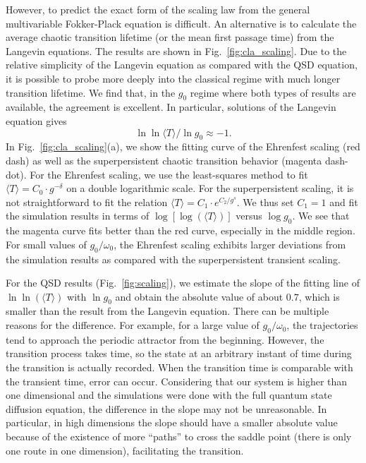 \documentclass[12pt]{wlscirep}
\begin{document}
However, to predict the exact form of the scaling law from the general 
multivariable Fokker-Plack equation is difficult. An alternative is to
calculate the average chaotic transition lifetime (or the mean first
passage time) from the Langevin equations. The results are shown in
Fig.~\ref{fig:cla_scaling}. Due to the relative simplicity of the Langevin
equation as compared with the QSD equation, it is possible to probe more
deeply into the classical regime with much longer transition lifetime. 
We find that, in the $g_0$ regime where both types of results are available,
the agreement is excellent. In particular, solutions of the Langevin
equation gives
\begin{displaymath}
\ln{\ln{\langle T\rangle}}/\ln{g_0} \approx -1.
\end{displaymath}
In Fig.~\ref{fig:cla_scaling}(a), we show the fitting curve of the
Ehrenfest scaling (red dash) as well as the superpersistent chaotic transition
behavior (magenta dash-dot). For the Ehrenfest scaling, we use the 
least-squares method to fit $\langle T\rangle=C_0\cdot g^{-\delta}$ on a 
double logarithmic scale. For the superpersistent scaling, it is not 
straightforward to fit the relation $\langle T\rangle=C_1\cdot e^{C_2/g^s}$. 
We thus set $C_1=1$ and fit the simulation results in terms of 
$\log{[\log{(\langle T\rangle)}]}$ versus $\log{g_0}$. We
see that the magenta curve fits better than the red curve, especially in 
the middle region. For small values of $g_0/\omega_0$, the Ehrenfest 
scaling exhibits larger deviations from the simulation results as compared 
with the superpersistent transient scaling.

For the QSD results (Fig.~\ref{fig:scaling}), we estimate the slope of the 
fitting line of $\ln{\ln{(\langle T\rangle)}}$ with $\ln{g_0}$ and obtain the 
absolute value of about $0.7$, which is smaller than the result from 
the Langevin equation. There can be multiple reasons for the difference.
For example, for a large value of $g_0/\omega_0$, the trajectories tend to 
approach the periodic attractor from the beginning. However, the transition 
process takes time, so the state at an arbitrary instant of time during 
the transition is actually recorded. When the transition time is comparable
with the transient time, error can occur. Considering that our system is
higher than one dimensional and the simulations were done with the full quantum
state diffusion equation, the difference in the slope may not be unreasonable.
In particular, in high dimensions the slope should have a smaller absolute value
because of the existence of more ``paths'' to cross the saddle point (there is
only one route in one dimension), facilitating the transition. 
\end{document}
